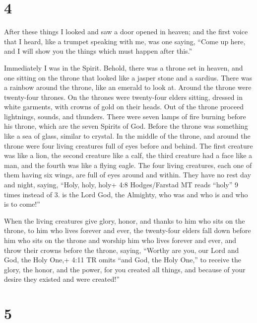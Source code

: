 \hypertarget{section-3}{%
\section{4}\label{section-3}}

 After these things I looked and saw a door opened in
heaven; and the first voice that I heard, like a trumpet speaking with
me, was one saying, ``Come up here, and I will show you the things which
must happen after this.''

 Immediately I was in the Spirit. Behold, there was a throne
set in heaven, and one sitting on the throne  that looked
like a jasper stone and a sardius. There was a rainbow around the
throne, like an emerald to look at.  Around the throne were
twenty-four thrones. On the thrones were twenty-four elders sitting,
dressed in white garments, with crowns of gold on their heads.
 Out of the throne proceed lightnings, sounds, and thunders.
There were seven lamps of fire burning before his throne, which are the
seven Spirits of God.  Before the throne was something like
a sea of glass, similar to crystal. In the middle of the throne, and
around the throne were four living creatures full of eyes before and
behind.  The first creature was like a lion, the second
creature like a calf, the third creature had a face like a man, and the
fourth was like a flying eagle.  The four living creatures,
each one of them having six wings, are full of eyes around and within.
They have no rest day and night, saying, ``Holy, holy, holy+ 4:8
Hodges/Farstad MT reads ``holy'' 9 times instead of 3. is the Lord God,
the Almighty, who was and who is and who is to come!''

 When the living creatures give glory, honor, and thanks to
him who sits on the throne, to him who lives forever and ever,
 the twenty-four elders fall down before him who sits on
the throne and worship him who lives forever and ever, and throw their
crowns before the throne, saying,  ``Worthy are you, our
Lord and God, the Holy One,+ 4:11 TR omits ``and God, the Holy One,'' to
receive the glory, the honor, and the power, for you created all things,
and because of your desire they existed and were created!''

\hypertarget{section-4}{%
\section{5}\label{section-4}}

